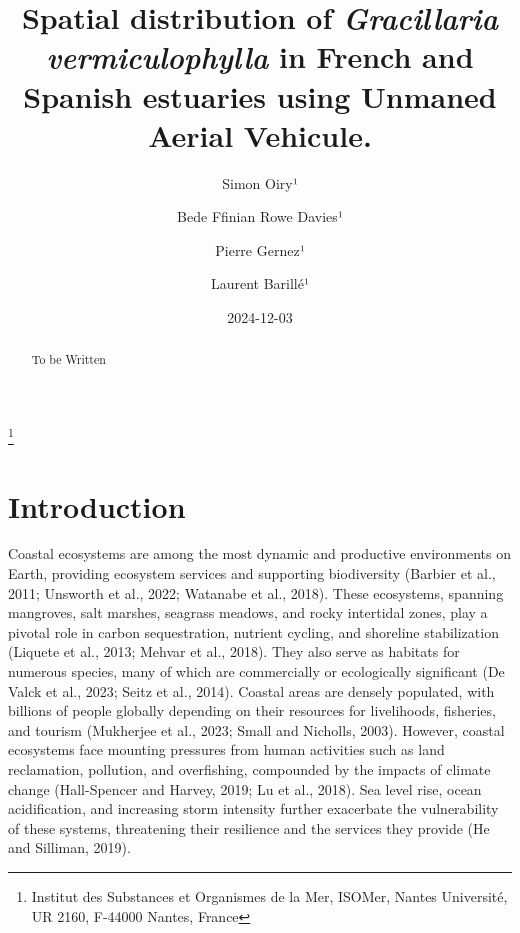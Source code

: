 \documentclass[
  letterpaper,
  DIV=11,
  numbers=noendperiod]{scrartcl}
\title{Spatial distribution of \emph{Gracillaria vermiculophylla} in
French and Spanish estuaries using Unmaned Aerial Vehicule.}
\author{Simon Oiry¹ \and Bede Ffinian Rowe Davies¹ \and Pierre
Gernez¹ \and Laurent Barillé¹}
\date{2024-12-03}
\begin{document}
\maketitle
\begin{abstract}
To be Written
\end{abstract}


\footnote{Institut des Substances et Organismes de la Mer, ISOMer,
  Nantes Université, UR 2160, F-44000 Nantes, France}

\section{Introduction}\label{introduction}

Coastal ecosystems are among the most dynamic and productive
environments on Earth, providing ecosystem services and supporting
biodiversity (Barbier et al., 2011; Unsworth et al., 2022; Watanabe et
al., 2018). These ecosystems, spanning mangroves, salt marshes, seagrass
meadows, and rocky intertidal zones, play a pivotal role in carbon
sequestration, nutrient cycling, and shoreline stabilization (Liquete et
al., 2013; Mehvar et al., 2018). They also serve as habitats for
numerous species, many of which are commercially or ecologically
significant (De Valck et al., 2023; Seitz et al., 2014). Coastal areas
are densely populated, with billions of people globally depending on
their resources for livelihoods, fisheries, and tourism (Mukherjee et
al., 2023; Small and Nicholls, 2003). However, coastal ecosystems face
mounting pressures from human activities such as land reclamation,
pollution, and overfishing, compounded by the impacts of climate change
(Hall-Spencer and Harvey, 2019; Lu et al., 2018). Sea level rise, ocean
acidification, and increasing storm intensity further exacerbate the
vulnerability of these systems, threatening their resilience and the
services they provide (He and Silliman, 2019).
\end{document}
